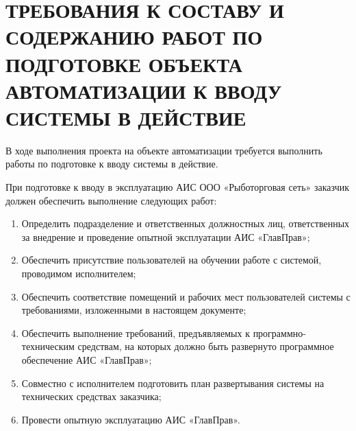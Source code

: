 \documentclass[russian, utf8, 12pt,pointsubsection,floatsubsection]{eskdtext}
\begin{document}
\section{ТРЕБОВАНИЯ К СОСТАВУ И СОДЕРЖАНИЮ РАБОТ ПО ПОДГОТОВКЕ ОБЪЕКТА АВТОМАТИЗАЦИИ К ВВОДУ СИСТЕМЫ В ДЕЙСТВИЕ}
В ходе выполнения проекта на объекте автоматизации требуется выполнить работы по подготовке к вводу системы в действие.

При подготовке к вводу в эксплуатацию АИС ООО «Рыботорговая сеть» заказчик должен обеспечить выполнение следующих работ:
\begin{enumerate}
    \item Определить подразделение и ответственных должностных лиц, ответственных за внедрение и проведение опытной эксплуатации АИС «ГлавПрав»;
    \item Обеспечить присутствие пользователей на обучении работе с системой, проводимом исполнителем;
    \item Обеспечить соответствие помещений и рабочих мест пользователей системы с требованиями, изложенными в настоящем документе;
    \item Обеспечить выполнение требований, предъявляемых к программно-техническим средствам, на которых должно быть развернуто программное обеспечение АИС «ГлавПрав»;
    \item Совместно с исполнителем подготовить план развертывания системы на технических средствах заказчика;
    \item Провести опытную эксплуатацию АИС «ГлавПрав».
\end{enumerate} 
\end{document}
